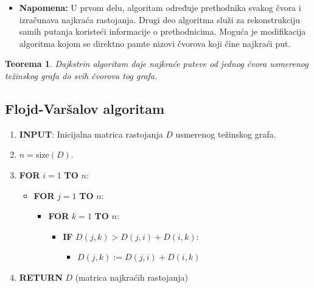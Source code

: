 \documentclass[a4paper,12pt,twoside]{report}
\newtheorem{theorem}{Teorema}[section]
\numberwithin{algorithm}{section}
\begin{document}
\begin{itemize}
    \item \textbf{Napomena:} U prvom delu, algoritam određuje prethodnika svakog čvora i izračunava najkraća rastojanja. Drugi deo algoritma služi za rekonstrukciju samih putanja koristeći informacije o prethodnicima. Moguća je modifikacija algoritma kojom se direktno pamte nizovi čvorova koji čine najkraći put.
\end{itemize}

\begin{theorem}
    Dajkstrin algoritam daje najkraće puteve od jednog čvora usmerenog težinskog grafa do svih čvorova tog grafa.
\end{theorem}
\newpage
\subsection{Flojd-Varšalov algoritam}
\begin{algorithm}[ht]
    \caption{Flojd-Varšalov algoritam}
    \begin{enumerate}
        \item \textbf{INPUT}: Inicijalna matrica rastojanja $D$ usmerenog težinskog grafa.
        \item $n = \text{size}(D)$.
        \item \textbf{FOR} $i = 1$ \textbf{TO} $n$:
        \begin{itemize}
            \item \textbf{FOR} $j = 1$ \textbf{TO} $n$:
            \begin{itemize}
                \item \textbf{FOR} $k = 1$ \textbf{TO} $n$:
                \begin{itemize}
                    \item \textbf{IF} $D(j, k) > D(j, i) + D(i, k)$:
                    \begin{itemize}
                        \item $D(j, k) := D(j, i) + D(i, k)$
                    \end{itemize}
                \end{itemize}
            \end{itemize}
        \end{itemize}
        \item \textbf{RETURN} $D$ (matrica najkraćih rastojanja)
    \end{enumerate}
\end{algorithm}
\end{document}
